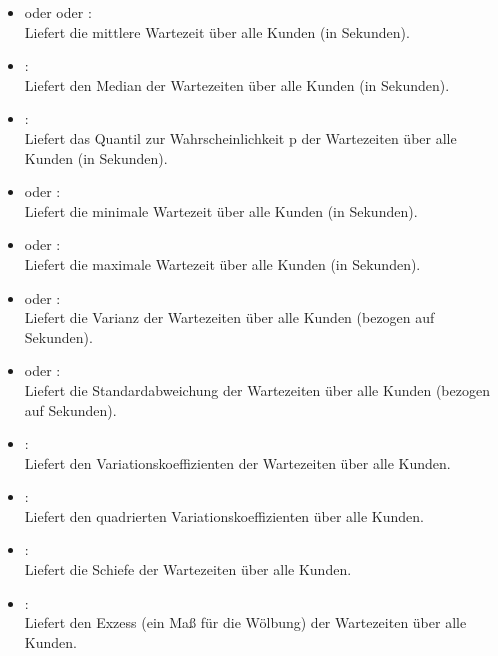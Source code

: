 \begin{itemize}

\item
{} oder  oder :\\
Liefert die mittlere Wartezeit über alle Kunden (in Sekunden).

\item
{}:\\
Liefert den Median der Wartezeiten über alle Kunden (in Sekunden).

\item
{}:\\
Liefert das Quantil zur Wahrscheinlichkeit p der Wartezeiten über alle Kunden (in Sekunden).

\item
{} oder :\\
Liefert die minimale Wartezeit über alle Kunden (in Sekunden).

\item
{} oder :\\
Liefert die maximale Wartezeit über alle Kunden (in Sekunden).

\item
{} oder :\\
Liefert die Varianz der Wartezeiten über alle Kunden (bezogen auf Sekunden).

\item
{} oder :\\
Liefert die Standardabweichung der Wartezeiten über alle Kunden (bezogen auf Sekunden).

\item
{}:\\
Liefert den Variationskoeffizienten der Wartezeiten über alle Kunden.

\item
{}:\\
Liefert den quadrierten Variationskoeffizienten über alle Kunden.

\item
{}:\\
Liefert die Schiefe der Wartezeiten über alle Kunden.

\item
{}:\\
Liefert den Exzess (ein Maß für die Wölbung) der Wartezeiten über alle Kunden.


\end{itemize}
